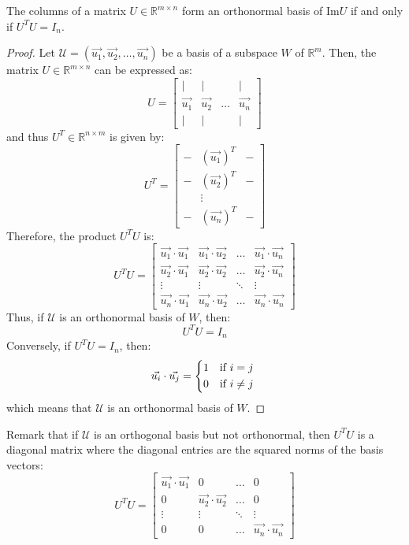 \begin{theorem}
    The columns of a matrix $U \in \mathbb{R}^{m \times n}$ form an orthonormal basis of $\text{Im} U$ if and only if $U^T U = I_n$.
\end{theorem}
\begin{proof}
    Let $\mathcal{U} = (\vec{u_1}, \vec{u_2}, \ldots, \vec{u_n})$ be a basis of a subspace $W$ of $\mathbb{R}^m$. Then, the matrix $U \in \mathbb{R}^{m \times n}$ can be expressed as:
    \[
        U = \begin{bmatrix}
            | & | & & | \\
            \vec{u_1} & \vec{u_2} & \ldots & \vec{u_n} \\
            | & | & & |
        \end{bmatrix}
    \]
    and thus $U^T \in \mathbb{R}^{n \times m}$ is given by:
    \[
        U^T = \begin{bmatrix}
            - & (\vec{u_1})^T & - \\
            - & (\vec{u_2})^T & - \\
            & \vdots & \\
            - & (\vec{u_n})^T & -
        \end{bmatrix}
    \]
    Therefore, the product $U^T U$ is:
    \[
        U^T U = \begin{bmatrix}
            \vec{u_1} \cdot \vec{u_1} & \vec{u_1} \cdot \vec{u_2} & \ldots & \vec{u_1} \cdot \vec{u_n} \\
            \vec{u_2} \cdot \vec{u_1} & \vec{u_2} \cdot \vec{u_2} & \ldots & \vec{u_2} \cdot \vec{u_n} \\
            \vdots & \vdots & \ddots & \vdots \\
            \vec{u_n} \cdot \vec{u_1} & \vec{u_n} \cdot \vec{u_2} & \ldots & \vec{u_n} \cdot \vec{u_n}
        \end{bmatrix}
    \]
    Thus, if $\mathcal{U}$ is an orthonormal basis of $W$, then:
    \[
        U^T U = I_n
    \]
    Conversely, if $U^T U = I_n$, then:
    \[
        \vec{u_i} \cdot \vec{u_j} = \begin{cases*}
            1 & if $i = j$ \\
            0 & if $i \neq j$
        \end{cases*}
    \]
    which means that $\mathcal{U}$ is an orthonormal basis of $W$.
\end{proof}
Remark that if $\mathcal{U}$ is an orthogonal basis but not orthonormal, then $U^T U$ is a diagonal matrix where the diagonal entries are the squared norms of the basis vectors:
\[
    U^T U = \begin{bmatrix}
        \vec{u_1} \cdot \vec{u_1} & 0 & \ldots & 0 \\
        0 & \vec{u_2} \cdot \vec{u_2} & \ldots & 0 \\
        \vdots & \vdots & \ddots & \vdots \\
        0 & 0 & \ldots & \vec{u_n} \cdot \vec{u_n}
    \end{bmatrix}
\]

